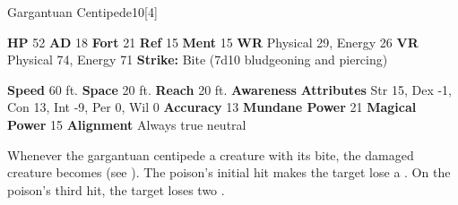   \begin{monsubsection}{Gargantuan Centipede}{10}[4]
    \vspace{-1em}\vspace{-1em}
    \vspace{0em}

    
    

    \begin{spellcontent}
      \begin{spelltargetinginfo}
        \pari \textbf{HP} 52 \monsep
          \textbf{AD} 18 \monsep
          \textbf{Fort} 21 \monsep
          \textbf{Ref} 15 \monsep
          \textbf{Ment} 15
        \pari \textbf{WR} Physical 29, Energy 26 \monsep
        \textbf{VR} Physical 74, Energy 71
        \pari \textbf{Strike:}
            Bite  (7d10 bludgeoning and piercing)
      \end{spelltargetinginfo}
    \end{spellcontent}
    \begin{monsterfooter}
      \pari \textbf{Speed} 60 ft. \monsep
        \textbf{Space} 20 ft. \monsep
        \textbf{Reach} 20 ft.
      \pari \textbf{Awareness} 
      \pari \textbf{Attributes}
        Str 15, Dex -1,
        Con 13, Int -9,
        Per 0, Wil 0
      \pari \textbf{Accuracy} 13 \monsep
        \textbf{Mundane Power} 21 \monsep
      \textbf{Magical Power} 15
      \pari \textbf{Alignment} Always true neutral
    \end{monsterfooter}
  \end{monsubsection}
        Whenever the gargantuan centipede  a creature with its bite,
          the damaged creature becomes  (see ).
        The poison's initial hit makes the target lose a .
        On the poison's third hit, the target loses two .
  

